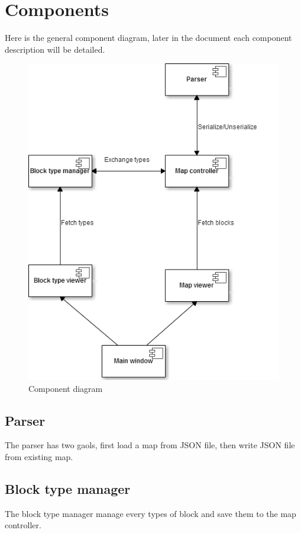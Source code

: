 \newpage
\thispagestyle{empty}

\chapter{Components}

Here is the general component diagram, later in the document each component description will be detailed.

\begin{figure}[H]
	\centering
	\includegraphics[scale=0.50]{component.png}
	\caption{Component diagram}
\end{figure}

\section{Parser}
The parser has two gaols, first load a map from JSON file, then write JSON file from existing map.
\section{Block type manager}
The block type manager manage every types of block and save them to the map controller. 
